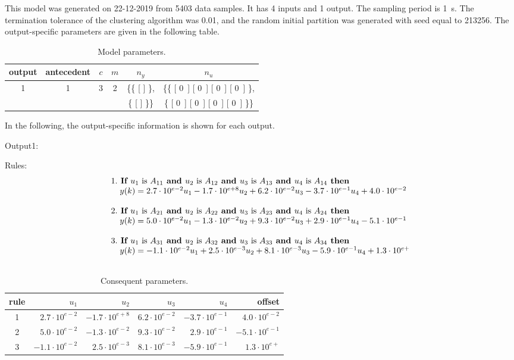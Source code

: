 \documentclass{article}
\def\If{\mbox{\bf~If~}}                   %
\def\Then{\mbox{\bf~then~}}               %
\def\Is{\mbox{~is~}}                      %
\def\And{\mbox{\bf~and~}}                 %
\begin{document}
This model was generated on 22-12-2019 from 5403 data samples.
It has 4 inputs and 1 output. The sampling period is 1~s.
The termination tolerance of the clustering algorithm was 0.01,
and the random initial partition was generated with seed equal to 213256.
The output-specific parameters are given in the following table.


\begin{table}[htbp]
\centering
\caption{Model parameters.}
\begin{tabular}{|c|ccccc|}\hline
output & antecedent & $c$ & $m$ & $n_y$ & $n_u$ \\ \hline
1 & 1 & 3 & 2 & \{\{ [ ] \}, & \{\{ [ 0\, ] [ 0\, ] [ 0\, ] [ 0\, ] \}, \\
 &  &  &  & \{ [ ] \}\} & \{ [ 0\, ] [ 0\, ] [ 0\, ] [ 0\, ] \}\} \\ \hline
\end{tabular}
\label{tab:params}
\end{table}


In the following, the output-specific information is shown for each output.

Output1:


Rules:
$$
\begin{array}{l@{\hspace*{-0em}}l}
1. & \If u_1 \Is A_{11}\And u_2 \Is A_{12}\And u_3 \Is A_{13}\And u_4 \Is A_{14} \Then \\
   & \; y(k) = 2.7\cdot 10^{e-2}u_1-1.7\cdot 10^{e+8}u_2+6.2\cdot 10^{e-2}u_3-3.7\cdot 10^{e-1}u_4+4.0\cdot 10^{e-2} \\ \\
2. & \If u_1 \Is A_{21}\And u_2 \Is A_{22}\And u_3 \Is A_{23}\And u_4 \Is A_{24} \Then \\
   & \; y(k) = 5.0\cdot 10^{e-2}u_1-1.3\cdot 10^{e-2}u_2+9.3\cdot 10^{e-2}u_3+2.9\cdot 10^{e-1}u_4-5.1\cdot 10^{e-1} \\ \\
3. & \If u_1 \Is A_{31}\And u_2 \Is A_{32}\And u_3 \Is A_{33}\And u_4 \Is A_{34} \Then \\
   & \; y(k) = -1.1\cdot 10^{e-2}u_1+2.5\cdot 10^{e-3}u_2+8.1\cdot 10^{e-3}u_3-5.9\cdot 10^{e-1}u_4+1.3\cdot 10^{e+} \\ \\
\end{array}
$$


\begin{table}[htbp]
\centering
\caption{Consequent parameters.}
\begin{tabular}{|c|rrrrr|}\hline
rule & $u_1$ & $u_2$ & $u_3$ & $u_4$ &  offset \\ \hline
   1 & $2.7\cdot 10^{e-2}$ & $-1.7\cdot 10^{e+8}$ & $ 6.2\cdot 10^{e-2}$ & $-3.7\cdot 10^{e-1}$ & $ 4.0\cdot 10^{e-2}$ \\
   2 & $5.0\cdot 10^{e-2}$ & $-1.3\cdot 10^{e-2}$ & $ 9.3\cdot 10^{e-2}$ & $ 2.9\cdot 10^{e-1}$ & $-5.1\cdot 10^{e-1}$ \\
   3 & $-1.1\cdot 10^{e-2}$ & $ 2.5\cdot 10^{e-3}$ & $ 8.1\cdot 10^{e-3}$ & $-5.9\cdot 10^{e-1}$ & $ 1.3\cdot 10^{e+}$ \\
\hline
\end{tabular}
\label{tab:cons1}
\end{table}
\end{document}
